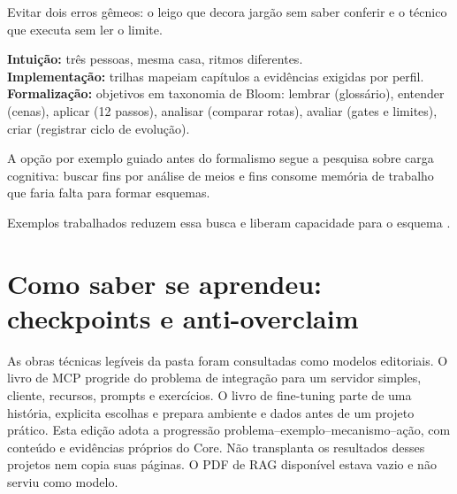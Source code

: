 \begin{funcao}
Evitar dois erros gêmeos: o leigo que decora jargão sem saber conferir e o técnico que executa sem ler o limite.
\end{funcao}

\begin{niveis}
\textbf{Intuição:} três pessoas, mesma casa, ritmos diferentes.\\
\textbf{Implementação:} trilhas mapeiam capítulos a evidências exigidas por perfil.\\
\textbf{Formalização:} objetivos em taxonomia de Bloom: lembrar (glossário), entender (cenas), aplicar (12 passos), analisar (comparar rotas), avaliar (gates e limites), criar (registrar ciclo de evolução).
\end{niveis}

A opção por exemplo guiado antes do formalismo segue a pesquisa sobre carga cognitiva: buscar fins por análise de meios e fins consome memória de trabalho que faria falta para formar esquemas.

Exemplos trabalhados reduzem essa busca e liberam capacidade para o esquema .

\section{Como saber se aprendeu: checkpoints e anti-overclaim}

As obras técnicas legíveis da pasta  foram consultadas como
modelos editoriais. O livro de MCP progride do problema de integração para um
servidor simples, cliente, recursos, prompts e exercícios. O livro de fine-tuning
parte de uma história, explicita escolhas e prepara ambiente e dados antes de um
projeto prático. Esta edição adota a progressão problema--exemplo--mecanismo--ação,
com conteúdo e evidências próprios do Core. Não transplanta os resultados desses
projetos nem copia suas páginas. O PDF de RAG disponível estava vazio e não serviu
como modelo.


